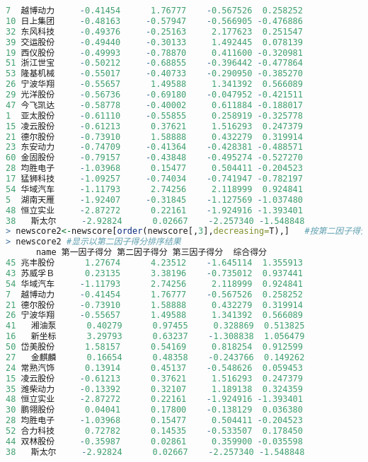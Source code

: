 \documentclass[11pt,a4paper,oneside]{book}
\begin{document}
\begin{lstlisting}[language=r]
7  越博动力     -0.41454      1.76777    -0.567526  0.258252
10 日上集团     -0.48163     -0.57947    -0.566905 -0.476886
32 东风科技     -0.49376     -0.25163     2.177623  0.251547
39 交运股份     -0.49440     -0.30133     1.492445  0.078139
19 西仪股份     -0.49993     -0.78870     0.411600 -0.320981
51 浙江世宝     -0.50212     -0.68855    -0.396442 -0.477864
53 隆基机械     -0.55017     -0.40733    -0.290950 -0.385270
26 宁波华翔     -0.55657      1.49588     1.341392  0.566089
29 光洋股份     -0.56736     -0.69180    -0.047952 -0.421511
47 今飞凯达     -0.58778     -0.40002     0.611884 -0.188017
1  亚太股份     -0.61110     -0.55855     0.258919 -0.325778
15 凌云股份     -0.61213      0.37621     1.516293  0.247379
21 德尔股份     -0.73910      1.58888     0.432279  0.319914
23 东安动力     -0.74709     -0.41364    -0.428381 -0.488571
60 金固股份     -0.79157     -0.43848    -0.495274 -0.527270
28 均胜电子     -1.03968      0.15477     0.504411 -0.204523
17 猛狮科技     -1.09257     -0.74034    -0.741947 -0.782197
54 华域汽车     -1.11793      2.74256     2.118999  0.924841
5  湖南天雁     -1.92407     -0.31845    -1.127569 -1.037480
48 恒立实业     -2.87272      0.22161    -1.924916 -1.393401
38   斯太尔     -2.92824      0.02667    -2.257340 -1.548848
> newscore2<-newscore[order(newscore[,3],decreasing=T),]   #按第二因子得分排序
> newscore2 #显示以第二因子得分排序结果
      name 第一因子得分 第二因子得分 第三因子得分  综合得分
45 兆丰股份      1.27674      4.23512    -1.645114  1.355913
43 苏威孚Ｂ      0.23135      3.38196    -0.735012  0.937441
54 华域汽车     -1.11793      2.74256     2.118999  0.924841
7  越博动力     -0.41454      1.76777    -0.567526  0.258252
21 德尔股份     -0.73910      1.58888     0.432279  0.319914
26 宁波华翔     -0.55657      1.49588     1.341392  0.566089
41   湘油泵      0.40279      0.97455     0.328869  0.513825
16   新坐标      3.29793      0.63237    -1.308838  1.056479
50 岱美股份      1.58157      0.54169     0.818254  0.912599
27   金麒麟      0.16654      0.48358    -0.243766  0.149262
24 常熟汽饰      0.13914      0.45137    -0.548626  0.059453
15 凌云股份     -0.61213      0.37621     1.516293  0.247379
35 潍柴动力     -0.13392      0.32107     1.189138  0.324359
48 恒立实业     -2.87272      0.22161    -1.924916 -1.393401
30 鹏翎股份      0.04041      0.17800    -0.138129  0.036380
28 均胜电子     -1.03968      0.15477     0.504411 -0.204523
52 合力科技      0.72782      0.14535    -0.533507  0.178450
44 双林股份     -0.35987      0.02861     0.359900 -0.035598
38   斯太尔     -2.92824      0.02667    -2.257340 -1.548848

\end{lstlisting}
\end{document}
